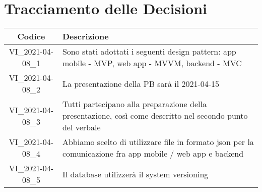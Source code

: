 \section*{Tracciamento delle Decisioni}

\begin{center}
	\begin{longtable}{|c|p{13cm}|}
	\hline
	\rowcolor{lighter-grayer}
	\textbf{Codice} & \textbf{Descrizione} \\
	\hline
	\endfirsthead

	\hline
	VI\_2021-04-08\_1 & Sono stati adottati i seguenti design pattern: app mobile - MVP, web app - MVVM, backend - MVC \\
	VI\_2021-04-08\_2 & La presentazione della PB sarà il 2021-04-15  \\
	VI\_2021-04-08\_3 & Tutti partecipano alla preparazione della presentazione, così come descritto nel secondo punto del verbale \\
	VI\_2021-04-08\_4 & Abbiamo scelto di utilizzare file in formato json per la comunicazione fra app mobile / web app e backend \\
	VI\_2021-04-08\_5 & Il database utilizzerà il system versioning \\
	\hline

	\end{longtable}
\end{center}